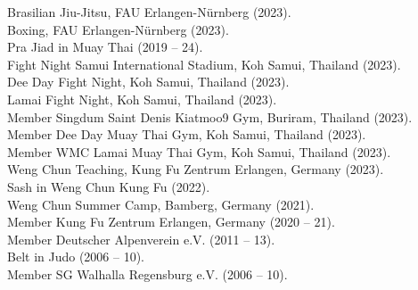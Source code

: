 \documentclass[a4paper,11pt]{article}
\newcommand{\years}[1]{\marginnote{\scriptsize #1}}
\begin{document}
\years{Sports}
Brasilian Jiu-Jitsu, FAU Erlangen-Nürnberg (2023).\\
Boxing, FAU Erlangen-Nürnberg (2023).\\
{\Large\color{amber}\circ} {\Large\color{bittersweet}\circ} {\Large\color{darkcyan}\circ} {\Large\color{denim}\circ} {\Large\color{darkmagenta}\circ} {\Large\color{red}\circ} {\Large\color{brown}\circ}  {\Large\color{black}\circ} Pra Jiad in Muay Thai (2019 -- 24).\\
Fight Night Samui International Stadium, Koh Samui, Thailand (2023).\\
Dee Day Fight Night, Koh Samui, Thailand (2023).\\
Lamai Fight Night, Koh Samui, Thailand (2023).\\
Member Singdum Saint Denis Kiatmoo9 Gym, Buriram, Thailand (2023).\\
Member Dee Day Muay Thai Gym, Koh Samui, Thailand (2023).\\
Member WMC Lamai Muay Thai Gym, Koh Samui, Thailand (2023).\\
Weng Chun Teaching, Kung Fu Zentrum Erlangen, Germany (2023).\\
{\Large\color{amber}\circ} {\Large\color{bittersweet}\circ} {\Large\color{darkcyan}\circ} Sash in Weng Chun Kung Fu (2022).\\
Weng Chun Summer Camp, Bamberg, Germany (2021).\\
Member Kung Fu Zentrum Erlangen, Germany (2020 -- 21).\\
Member Deutscher Alpenverein e.V. (2011 -- 13).\\
{\Large\color{amber}\circ} {\Large\color{bittersweet}\circ} {\Large\color{darkcyan}\circ} {\Large\color{denim}\circ} Belt in Judo (2006 -- 10).\\
Member SG Walhalla Regensburg e.V. (2006 -- 10).
\end{document}
